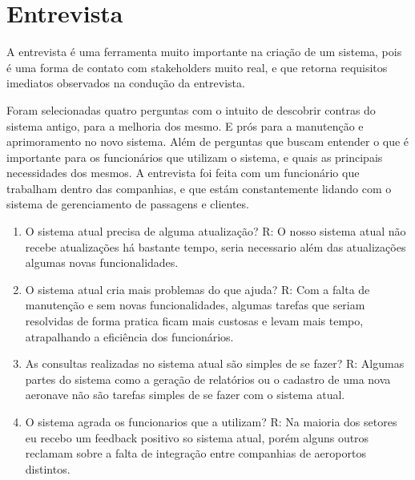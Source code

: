 \section{Entrevista}
A entrevista é uma ferramenta muito importante na criação de um sistema, pois é uma forma de
contato com stakeholders muito real, e que retorna requisitos imediatos observados na condução da
entrevista.

Foram selecionadas quatro perguntas com o intuito de descobrir contras do sistema antigo, para a
melhoria dos mesmo. E prós para a manutenção e aprimoramento no novo sistema. Além de
perguntas que buscam entender o que é importante para os funcionários que utilizam o sistema,
e quais as principais necessidades dos mesmos. A entrevista foi feita com um funcionário que
trabalham dentro das companhias, e que estám constantemente lidando com o sistema de
gerenciamento de passagens e clientes.\\


\begin{enumerate}
  \item O sistema atual precisa de alguma atualização?
        \subitem R: O nosso sistema atual não recebe atualizações há bastante 
        tempo, seria necessario além das atualizações algumas novas funcionalidades.\\
        
  \item O sistema atual cria mais problemas do que ajuda?
        \subitem R: Com a falta de manutenção e sem novas funcionalidades, algumas tarefas que seriam
        resolvidas de forma pratica ficam mais custosas e levam mais tempo,
        atrapalhando a eficiência dos funcionários.\\
        
  \item As consultas realizadas no sistema atual são simples de se fazer?
        \subitem R: Algumas partes do sistema como a geração de relatórios ou 
        o cadastro de uma nova aeronave não são tarefas simples de se fazer com o sistema atual.\\
        
  \item O sistema agrada os funcionarios que a utilizam?
        \subitem R: Na maioria dos setores eu recebo um feedback positivo so sistema atual, porém alguns outros
        reclamam sobre a falta de integração entre companhias de aeroportos distintos.
\end{enumerate}





